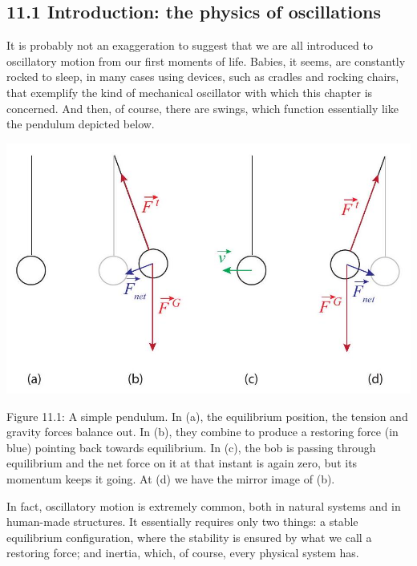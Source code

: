 \documentclass[10pt]{article}
\begin{document}
\subsection*{11.1 Introduction: the physics of oscillations}
It is probably not an exaggeration to suggest that we are all introduced to oscillatory motion from our first moments of life. Babies, it seems, are constantly rocked to sleep, in many cases using devices, such as cradles and rocking chairs, that exemplify the kind of mechanical oscillator with which this chapter is concerned. And then, of course, there are swings, which function essentially like the pendulum depicted below.

\begin{center}
\includegraphics[max width=\textwidth]{2024_09_14_9969b06773f10b6936e8g-271}
\end{center}

Figure 11.1: A simple pendulum. In (a), the equilibrium position, the tension and gravity forces balance out. In (b), they combine to produce a restoring force (in blue) pointing back towards equilibrium. In (c), the bob is passing through equilibrium and the net force on it at that instant is again zero, but its momentum keeps it going. At (d) we have the mirror image of (b).

In fact, oscillatory motion is extremely common, both in natural systems and in human-made structures. It essentially requires only two things: a stable equilibrium configuration, where the stability is ensured by what we call a restoring force; and inertia, which, of course, every physical system has.
\end{document}
